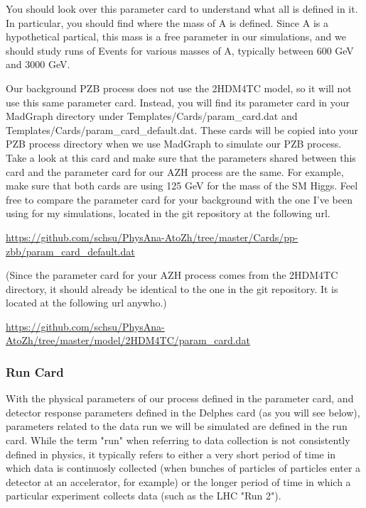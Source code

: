 \documentclass{article}
\begin{document}
\bigskip

You should look over this parameter card to understand what all is defined in it. In
particular, you should find where the mass of A is defined. Since A is a hypothetical partical, this mass is a free parameter
in our simulations, and we should study runs of Events for various masses of A, typically between 600 GeV and 3000 GeV.

\bigskip

Our background PZB process does not use the 2HDM4TC model, so it will not use this same parameter card. Instead, you will
find its parameter card in your MadGraph directory under Templates/Cards/param\_card.dat and Templates/Cards/param\_card\_default.dat.
These cards will be copied into your PZB process directory when we use MadGraph to simulate our PZB process. Take a look at this card
and make sure that the parameters shared between this card and the parameter card for our AZH process are the same. For example,
make sure that both cards are using 125 GeV for the mass of the SM Higgs.
Feel free to compare the parameter card for your background with the one I've been using for my simulations, located in the git repository at the following url.

\bigskip

\url{https://github.com/schsu/PhysAna-AtoZh/tree/master/Cards/pp-zbb/param_card_default.dat}

\bigskip

(Since the parameter card for your AZH process comes from the 2HDM4TC directory, it should already be identical to the one in the git repository.
It is located at the following url anywho.)

\bigskip

\url{https://github.com/schsu/PhysAna-AtoZh/tree/master/model/2HDM4TC/param_card.dat}

\subsubsection{Run Card}
\label{sec:runCard}

With the physical parameters of our process defined in the parameter card, and detector response parameters defined in the Delphes card (as you will see below),
parameters related to the data run we will be simulated are defined in the run card. While the term "run" when referring to data collection
is not consistently defined in physics, it typically refers to either a very short period of time in which data is continuosly collected (when bunches
of particles of particles enter a detector at an accelerator, for example) or the longer period of time in which a particular experiment collects data
(such as the LHC "Run 2").
\end{document}
